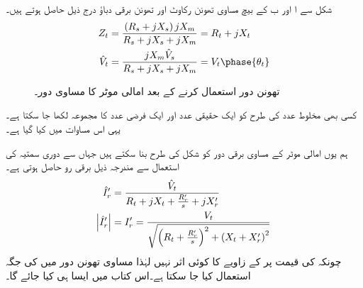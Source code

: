 شکل   سے  ا اور ب کے بیچ مساوی تھونن  رکاوٹ  اور تھونن برقی دباؤ  درج ذیل حاصل ہوتے ہیں۔
\begin{gather}
\begin{aligned}\label{مساوات_امالی_تھونن_متغرات}
Z_t&=\frac{\left(R_s+j X_s \right) j X_m}{R_s +j X_s + j X_m}=R_t+j X_t\\
\hat{V}_t&=\frac{j X_m \hat{V}_s}{R_s +j X_s + j X_m}=V_t \phase{\theta_t}
\end{aligned}
\end{gather}
%
\begin{figure}
\centering
%
\caption{تھونن دور استعمال کرنے کے بعد امالی موٹر کا مساوی دور۔}
\label{شکل_امالی_تھونن_استعمال_کرتے_ہوئے}
\end{figure}
کسی بھی مخلوط عدد کی طرح   کو ایک حقیقی عدد  اور ایک فرضی عدد  کا مجموعہ لکھا جا سکتا ہے۔ یہی اس مساوات میں کیا گیا ہے۔

ہم یوں امالی موٹر کے مساوی برقی دور کو شکل   کی طرح بنا سکتے ہیں جہاں سے دوری سمتیہ کی استعمال سے مندرجہ ذیل برقی رو  حاصل ہوتی ہے۔
\begin{gather}
\begin{aligned}\label{مساوات_امالی_گھمتا_رو}
\hat{I}_r'&=\frac{\hat{V}_t}{R_t +  j X_t +\frac{R_r'}{s}+ j X_r'}\\
\abs{\hat{I}_r'}&=I_r'=\frac{V_t}{\sqrt{\left(R_t+\frac{R_r'}{s} \right)^2+\left(X_t+X_r' \right)^2}}
\end{aligned}
\end{gather}
چونکہ  کی   قیمت پر  کے زاویے کا کوئی اثر نہیں لہٰذا مساوی تھونن دور میں  کی جگہ   استعمال کیا جا سکتا ہے۔اس کتاب میں ایسا ہی کیا جائے گا۔ 

